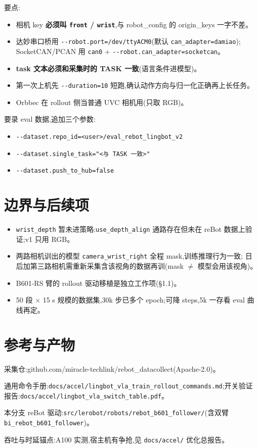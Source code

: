 \documentclass[11pt]{ctexart}
\begin{document}
要点:
\begin{itemize}
\item 相机 key \textbf{必须叫 \texttt{front} / \texttt{wrist}},与 robot\_config 的 origin\_keys 一字不差。
\item 达妙串口桥用 \texttt{-{}-robot.port=/dev/ttyACM0}(默认 \texttt{can\_adapter=damiao});
SocketCAN/PCAN 用 \texttt{can0} + \texttt{-{}-robot.can\_adapter=socketcan}。
\item \textbf{task 文本必须和采集时的 TASK 一致}(语言条件进模型)。
\item 第一次上机先 \texttt{-{}-duration=10} 短跑,确认动作方向与归一化正确再上长任务。
\item Orbbec 在 rollout 侧当普通 UVC 相机用(只取 RGB)。
\end{itemize}

要录 eval 数据,追加三个参数:
\begin{itemize}
\item \texttt{-{}-dataset.repo\_id=<user>/eval\_rebot\_lingbot\_v2}
\item \texttt{-{}-dataset.single\_task="<与 TASK 一致>"}
\item \texttt{-{}-dataset.push\_to\_hub=false}
\end{itemize}

\section{边界与后续项}
\begin{itemize}
\item \texttt{wrist\_depth} 暂未进策略:\texttt{use\_depth\_align} 通路存在但未在 reBot 数据上验证;v1 只用 RGB。
\item 两路相机训出的模型 \texttt{camera\_wrist\_right} 全程 mask,训练推理行为一致;
日后加第三路相机需重新采集含该视角的数据再训(mask $\ne$ 模型会用该视角)。
\item B601-RS 臂的 rollout 驱动移植是独立工作项(§1.1)。
\item 50 段 $\times$ 15 s 规模的数据集,30k 步已多个 epoch;可降 steps,5k 一存看 eval 曲线再定。
\end{itemize}

\section*{参考与产物}
\begin{enumerate}[label={[\arabic*]},leftmargin=2.2em]
\item 采集仓:github.com/miracle-techlink/rebot\_datacollect(Apache-2.0)。
\item 通用命令手册:\newline \texttt{docs/accel/lingbot\_vla\_train\_rollout\_commands.md};\newline 开关验证报告:\texttt{docs/accel/lingbot\_vla\_switch\_table.pdf}。
\item 本分支 reBot 驱动:\newline \texttt{src/lerobot/robots/rebot\_b601\_follower/}(含双臂 \texttt{bi\_rebot\_b601\_follower})。
\item 吞吐与时延锚点:A100 实测,宿主机有争抢,见 \texttt{docs/accel/} 优化总报告。
\end{enumerate}
\end{document}
